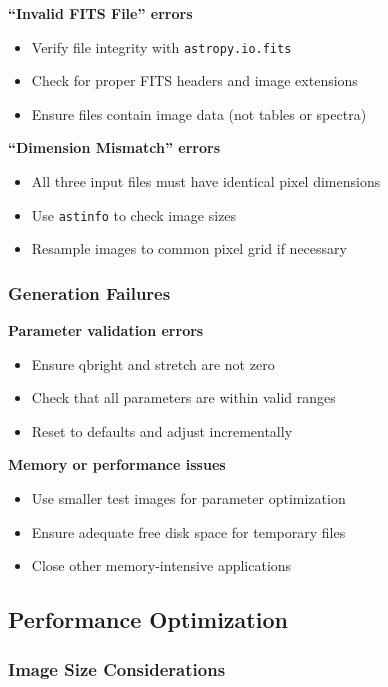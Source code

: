 \documentclass[11pt,a4paper]{article}
\begin{document}
\textbf{``Invalid FITS File'' errors}
\begin{itemize}[leftmargin=*]
\item Verify file integrity with \texttt{astropy.io.fits}
\item Check for proper FITS headers and image extensions
\item Ensure files contain image data (not tables or spectra)
\end{itemize}

\textbf{``Dimension Mismatch'' errors}
\begin{itemize}[leftmargin=*]
\item All three input files must have identical pixel dimensions
\item Use \texttt{astinfo} to check image sizes
\item Resample images to common pixel grid if necessary
\end{itemize}

\subsubsection{Generation Failures}

\textbf{Parameter validation errors}
\begin{itemize}[leftmargin=*]
\item Ensure qbright and stretch are not zero
\item Check that all parameters are within valid ranges
\item Reset to defaults and adjust incrementally
\end{itemize}

\textbf{Memory or performance issues}
\begin{itemize}[leftmargin=*]
\item Use smaller test images for parameter optimization
\item Ensure adequate free disk space for temporary files
\item Close other memory-intensive applications
\end{itemize}

\subsection{Performance Optimization}

\subsubsection{Image Size Considerations}
\end{document}
